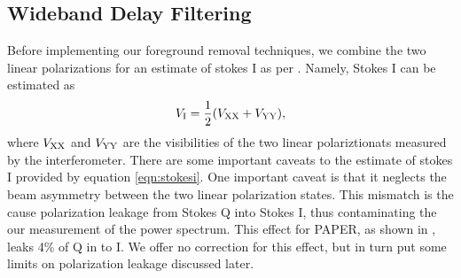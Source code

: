 \documentclass[twocolumn,numberedappendix]{emulateapj} \shorttitle{PSA64}
\begin{document}
%
%



\subsection{Wideband Delay Filtering}\label{sec:wbd_filtering}


Before implementing our foreground removal techniques, we combine the two
linear polarizations for an estimate of stokes I as per \citet{moore_et_al2013}.
Namely, Stokes I can be estimated as 
\begin{equation}\label{eqn:stokesi}
    V_{\rm I} = \frac12(V_{\rm XX}+V_{\rm YY}),
\end{equation}
where $V_{\rm XX}$ and $V_{\rm YY}$ are the visibilities of the two linear
polariztionats measured by the interferometer. There are some important caveats
to the estimate of stokes I provided by equation \ref{eqn:stokesi}. One
important caveat is that it neglects the beam asymmetry  between the two linear
polarization states. This mismatch is the cause polarization leakage from Stokes
Q into Stokes I, thus contaminating the our measurement of the power spectrum.
This effect for PAPER, as shown in \citet{moore_et_al2013}, leaks 4\% of Q in to
I.  We offer no correction for this effect, but in turn put some limits on
polarization leakage discussed later. 
\end{document}
